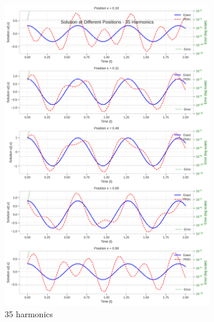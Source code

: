 \begin{figure}[H]
    \centering
    \begin{subfigure}[b]{0.32\textwidth}
        \centering
        \includegraphics[width=\textwidth]{figures/space_slices_35h.png}
        \caption{35 harmonics}
    \end{subfigure}
    \hfill
    \begin{subfigure}[b]{0.32\textwidth}
        \centering

\end{subfigure}
\end{figure}
